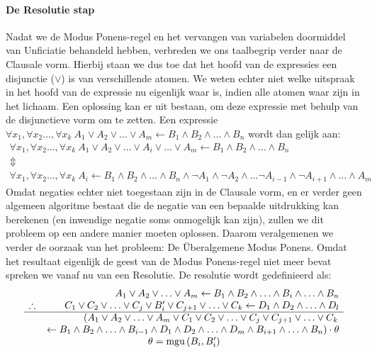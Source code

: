 \paragraph{De Resolutie stap}Nadat we de Modus Ponens-regel en het vervangen van variabelen doormiddel van Unficiatie behandeld hebben, verbreden we ons taalbegrip verder naar de Clausale vorm. Hierbij staan we dus toe dat het hoofd van de expressies een disjunctie ($\vee$) is van verschillende atomen. We weten echter niet welke uitspraak in het hoofd van de expressie nu eigenlijk waar is, indien alle atomen waar zijn in het lichaam. Een oplossing kan er uit bestaan, om deze expressie met behulp van de disjunctieve vorm om te zetten. Een expressie $\forall x_1,\forall x_2\ldots,\forall x_k\ A_1\vee A_2\vee\ldots\vee A_m\leftarrow B_1\wedge B_2\wedge\ldots\wedge B_n$ wordt dan gelijk aan:
\begin{equation}
\begin{array}{c}
\forall x_1,\forall x_2\ldots,\forall x_k\ A_1\vee A_2\vee\ldots\vee A_i\vee\ldots\vee A_m\leftarrow B_1\wedge B_2\wedge\ldots\wedge B_n\\
\Updownarrow\\
\forall x_1,\forall x_2\ldots,\forall x_k\ A_i\leftarrow B_1\wedge B_2\wedge\ldots\wedge B_n\wedge\neg A_1\wedge\neg A_2\wedge\ldots\neg A_{i-1}\wedge\neg A_{i+1}\wedge\ldots\wedge A_m
\end{array}
\end{equation}
Omdat negaties echter niet toegestaan zijn in de Clausale vorm, en er verder geen algemeen algoritme bestaat die de negatie van een bepaalde uitdrukking kan berekenen (en inwendige negatie soms onmogelijk kan zijn), zullen we dit probleem op een andere manier moeten oplossen. Daarom veralgemenen we verder de oorzaak van het probleem: De \"Uberalgemene Modus Ponens. Omdat het resultaat eigenlijk de geest van de Modus Ponens-regel niet meer bevat spreken we vanaf nu van een Resolutie. De resolutie wordt gedefinieerd als:
\begin{equation}
\begin{array}{lr}
&A_1\vee A_2\vee\ldots\vee A_m\leftarrow B_1\wedge B_2\wedge\ldots\wedge B_i\wedge\ldots\wedge B_n\\
\therefore&C_1\vee C_2\vee\ldots\vee C_j\vee B_i'\vee C_{j+1}\vee\ldots\vee C_k\leftarrow D_1\wedge D_2\wedge\ldots\wedge D_l\\
\hline
&\left(A_1\vee A_2\vee\ldots\vee A_m\vee C_1\vee C_2\vee\ldots\vee C_j\vee C_{j+1}\vee\ldots\vee C_k\right.\\
&\left.\leftarrow B_1\wedge B_2\wedge\ldots\wedge B_{i-1}\wedge D_1\wedge D_2\wedge\ldots\wedge D_m\wedge B_{i+1}\wedge\ldots\wedge B_n\right)\cdot\theta\\
\multicolumn{2}{c}{\theta=\mathfunc{mgu}{B_i,B_i'}}
\end{array}
\end{equation}
